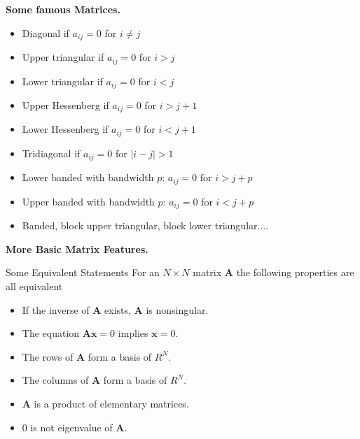 \documentclass{beamer}
\begin{document}
\begin{frame}

\noindent\textbf{Some famous Matrices.}
\begin{itemize}
  \item Diagonal if $a_{ij}=0$ for $i\ne j$

  \item Upper triangular if $a_{ij}=0$ for $i>j$

  \item Lower triangular if $a_{ij}=0$ for $i<j$

  \item Upper Hessenberg if $a_{ij}=0$ for $i>j+1$

  \item Lower Hessenberg if $a_{ij}=0$ for $i<j+1$

  \item Tridiagonal if $a_{ij}=0$ for $|i -j|>1$

  \item Lower banded with bandwidth $p$: $a_{ij}=0$ for $i>j+p$

  \item Upper banded with bandwidth $p$: $a_{ij}=0$ for $i<j+p$

  \item Banded, block upper triangular, block lower triangular....
\end{itemize}

\noindent
\end{frame}

\begin{frame}

\noindent\textbf{More Basic Matrix Features.}
\begin{block}{Some Equivalent Statements }
For an $N\times N$ matrix  $\mathbf{A}$ the following properties are all equivalent

\begin{itemize}
  \item If the inverse of $\mathbf{A}$ exists, $\mathbf{A}$ is nonsingular.

  \item The equation $\mathbf{Ax}=0$ implies $\mathbf{x}=0$.

  \item The rows of $\mathbf{A}$ form a basis of $R^N$.

  \item The columns of $\mathbf{A}$ form a basis of $R^N$.

  \item $\mathbf{A}$ is a product of elementary matrices.

  \item $0$ is not eigenvalue of $\mathbf{A}$.
\end{itemize}

\noindent
\end{block}
\end{frame}
\end{document}
